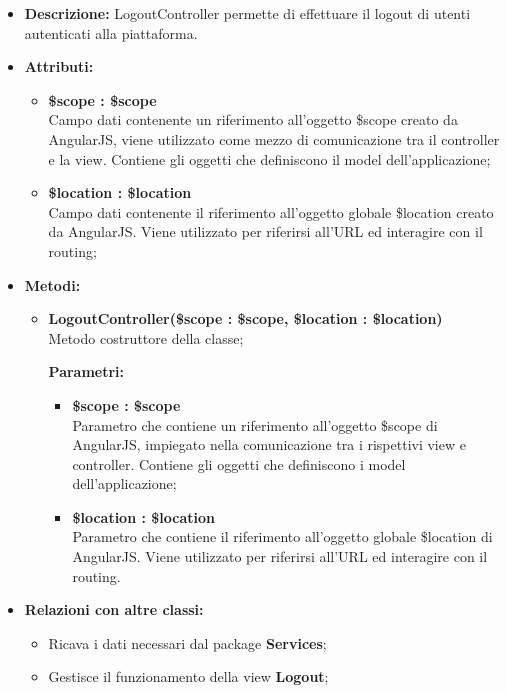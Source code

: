\begin{itemize}
	\item \textbf{Descrizione:} LogoutController permette di effettuare il logout di utenti autenticati alla piattaforma.
	\item \textbf{Attributi:}
	\begin{itemize}
		
		\item \textbf{\$scope : \$scope}\\
		Campo dati contenente un riferimento all'oggetto \$scope creato da AngularJS, viene utilizzato come mezzo di comunicazione tra il controller e la view. Contiene gli oggetti che definiscono il model dell'applicazione;
		
		\item \textbf{\$location : \$location }\\
		Campo dati contenente il riferimento all'oggetto globale \$location creato da AngularJS. Viene utilizzato per riferirsi all'URL ed interagire con il routing;
		
	\end{itemize}
	\item \textbf{Metodi:}
	\begin{itemize}
		
		\item \textbf{LogoutController(\$scope : \$scope, \$location : \$location)}\\
		Metodo costruttore della classe;
		\begin{description}
			\item[\textbf{Parametri:}]
		\end{description}
		\begin{itemize}
			\item \textbf{\$scope : \$scope}\\
			Parametro che contiene un riferimento all'oggetto \$scope di AngularJS, impiegato nella comunicazione tra i rispettivi view e controller. Contiene gli oggetti che definiscono i model dell'applicazione;
			
			\item \textbf{\$location : \$location}\\
			Parametro che contiene il riferimento all'oggetto globale \$location di AngularJS. Viene utilizzato per riferirsi all'URL ed interagire con il routing.
			
		\end{itemize}	
					
	\end{itemize}
	\item \textbf{Relazioni con altre classi:}
	\begin{itemize}
		\item Ricava i dati necessari dal package \textbf{Services};
		\item Gestisce il funzionamento della view \textbf{Logout};
	\end{itemize}
\end{itemize}

